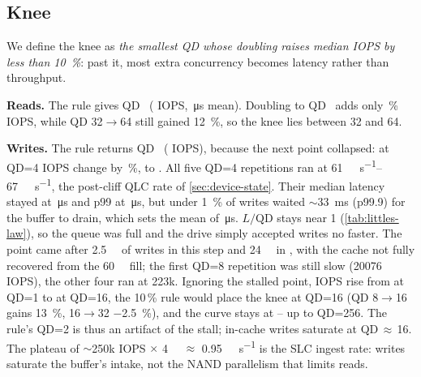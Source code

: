 \subsection{Knee}
We define the knee as \emph{the smallest QD whose doubling raises median IOPS by less than
\qty{10}{\percent}}: past it, most extra concurrency becomes latency rather than throughput.

\textbf{Reads.} The rule gives QD~
( IOPS,
\,\si{\micro\second} mean). Doubling to
QD~ adds only
\,\% IOPS, while QD 32$\to$64 still gained
\qty{12}{\percent}, so the knee lies between 32 and 64.

\textbf{Writes.} The rule returns QD~
( IOPS), because the next point collapsed: at QD=4 IOPS
change by \,\%, to
. All five QD=4 repetitions ran at
\qtyrange{61}{67}{\mebi\byte\per\second}, the post-cliff QLC rate of \cref{sec:device-state}. Their median
latency stayed at \,\si{\micro\second} and p99
at \,\si{\micro\second}, but under
\qty{1}{\percent} of writes waited \ensuremath{\sim}\qty{33}{\milli\second} (p99.9) for the buffer to drain, which sets
the mean of \,\si{\micro\second}. $L/\text{QD}$
stays near 1 (\cref{tab:littles-law}), so the queue was full and the drive simply accepted writes no
faster. The point came after \qty{2.5}{\gibi\byte} of writes in this step and \qty{24}{\gibi\byte} in
, with the cache not fully recovered from the \qty{60}{\gibi\byte} fill; the first QD=8
repetition was still slow (\num{20076} IOPS), the other four ran at \num{223}k. Ignoring the stalled
point, IOPS rise from  at QD=1 to
 at QD=16, the 10\,\% rule would place the knee at
QD=16 (QD 8$\to$16 gains \qty{13}{\percent}, 16$\to$32 \qty{-2.5}{\percent}), and the curve stays at
-- up
to QD=256. The rule's QD=2 is thus an artifact of the stall; in-cache writes saturate at QD\,$\approx$\,16.
The plateau of \ensuremath{\sim}\num{250}k IOPS $\times$ \qty{4}{\kibi\byte} $\approx$
\qty{0.95}{\gibi\byte\per\second} is the SLC ingest rate: writes saturate the buffer's intake, not the
NAND parallelism that limits reads.


